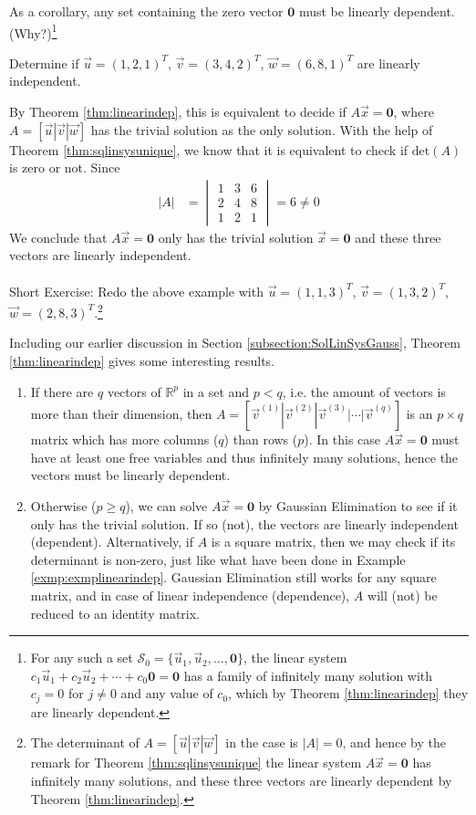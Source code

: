 As a corollary, any set containing the zero vector $\textbf{0}$ must be linearly dependent. (Why?)\footnote{For any such a set $\mathcal{S}_0 = \{\vec{u}_1, \vec{u}_2, \ldots, \textbf{0}\}$, the linear system $c_1\vec{u}_1 + c_2\vec{u}_2 + \cdots + c_0\textbf{0} = \textbf{0}$ has a family of infinitely many solution with $c_j = 0$ for $j \neq 0$ and any value of $c_0$, which by Theorem \ref{thm:linearindep} they are linearly dependent.}
\begin{exmp}
\label{exmp:exmplinearindep}
Determine if $\vec{u} = (1,2,1)^T$, $\vec{v} = (3,4,2)^T$, $\vec{w} = (6,8,1)^T$ are linearly independent.
\end{exmp}
By Theorem \ref{thm:linearindep}, this is equivalent to decide if $A\vec{x} = \textbf{0}$, where $A = [\vec{u}|\vec{v}|\vec{w}]$ has the trivial solution as the only solution. With the help of Theorem \ref{thm:sqlinsysunique}, we know that it is equivalent to check if $\text{det}(A)$ is zero or not. Since
\begin{align*}
|A| &=
\begin{vmatrix}
1 & 3 & 6\\
2 & 4 & 8 \\
1 & 2 & 1
\end{vmatrix} = 6 \neq 0
\end{align*}
We conclude that $A\vec{x} = \textbf{0}$ only has the trivial solution $\vec{x} = \textbf{0}$ and these three vectors are linearly independent. \\
\\
Short Exercise: Redo the above example with $\vec{u} = (1,1,3)^T$, $\vec{v} = (1,3,2)^T$, $\vec{w} = (2,8,3)^T$.\footnote{The determinant of $A = [\vec{u}|\vec{v}|\vec{w}]$ in the case is $|A| = 0$, and hence by the remark for Theorem \ref{thm:sqlinsysunique} the linear system $A\vec{x} = \textbf{0}$ has infinitely many solutions, and these three vectors are linearly dependent by Theorem \ref{thm:linearindep}.}\par
Including our earlier discussion in Section \ref{subsection:SolLinSysGauss}, Theorem \ref{thm:linearindep} gives some interesting results.
\begin{enumerate}
\item If there are $q$ vectors of $\mathbb{R}^p$ in a set and $p < q$, i.e. the amount of vectors is more than their dimension, then $A = [\vec{v}^{(1)}|\vec{v}^{(2)}|\vec{v}^{(3)}|\cdots|\vec{v}^{(q)}]$ is an $p \times q$ matrix which has more columns ($q$) than rows ($p$). In this case $A\vec{x} = \textbf{0}$ must have at least one free variables and thus infinitely many solutions, hence the vectors must be linearly dependent.
\item Otherwise ($p \geq q$), we can solve $A\vec{x} = \textbf{0}$ by Gaussian Elimination to see if it only has the trivial solution. If so (not), the vectors are linearly independent (dependent). Alternatively, if $A$ is a square matrix, then we may check if its determinant is non-zero, just like what have been done in Example \ref{exmp:exmplinearindep}. Gaussian Elimination still works for any square matrix, and in case of linear independence (dependence), $A$ will (not) be reduced to an identity matrix.
\end{enumerate}
